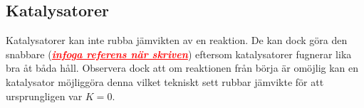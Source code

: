 \subsection{Katalysatorer}

Katalysatorer kan inte rubba jämvikten av en reaktion. De kan dock göra den snabbare (\textcolor{red}{\underline{\textit{\textbf{infoga referens när skriven}}}}) eftersom katalysatorer fugnerar lika bra åt båda håll. Observera dock att om reaktionen från börja är omöjlig kan en katalysator möjliggöra denna vilket tekniskt sett rubbar jämvikte för att ursprungligen var $K = 0$.